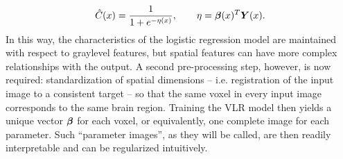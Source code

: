 \begin{equation}
  \hat{C}(x) = \frac{1}{1+e^{-\eta(x)}},\qquad\eta = \bm{\beta}(x)^T\bm{Y}(x).
  \label{eq:eq:vlrmodel}
\end{equation}
In this way, the characteristics of the logistic regression model are maintained with respect to graylevel features, but spatial features can have more complex relationships with the output. A second pre-processing step, however, is now required: standardization of spatial dimensions -- i.e. registration of the input image to a consistent target -- so that the same voxel in every input image corresponds to the same brain region. Training the VLR model then yields a unique vector $\bm{\beta}$ for each voxel, or equivalently, one complete image for each parameter. Such ``parameter images'', as they will be called, are then readily interpretable and can be regularized intuitively.
